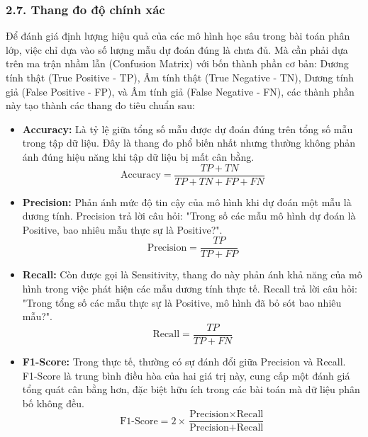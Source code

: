 \subsubsection{2.7. Thang đo độ chính xác}
\indent\indent Để đánh giá định lượng hiệu quả của các mô hình học sâu trong bài toán phân lớp, việc chỉ dựa vào số lượng mẫu dự đoán đúng là chưa đủ. Mà cần phải dựa trên ma trận nhầm lẫn (Confusion Matrix) với bốn thành phần cơ bản: Dương tính thật (True Positive - TP), Âm tính thật (True Negative - TN), Dương tính giả (False Positive - FP), và Âm tính giả (False Negative - FN), các thành phần này tạo thành các thang đo tiêu chuẩn sau:\vspace{-0.1cm}
\begin{itemize}[label={--}, itemsep=1pt]
    \item \textbf{Accuracy:} Là tỷ lệ giữa tổng số mẫu được dự đoán đúng trên tổng số mẫu trong tập dữ liệu. Đây là thang đo phổ biến nhất nhưng thường không phản ánh đúng hiệu năng khi tập dữ liệu bị mất cân bằng.
    \[
        \text{Accuracy} = \frac{TP + TN}{TP + TN + FP + FN}
    \]

    \item \textbf{Precision:} Phản ánh mức độ tin cậy của mô hình khi dự đoán một mẫu là dương tính. Precision trả lời câu hỏi: "Trong số các mẫu mô hình dự đoán là Positive, bao nhiêu mẫu thực sự là Positive?".
    \[
        \text{Precision} = \frac{TP}{TP + FP}
    \]

    \item \textbf{Recall:} Còn được gọi là Sensitivity, thang đo này phản ánh khả năng của mô hình trong việc phát hiện các mẫu dương tính thực tế. Recall trả lời câu hỏi: "Trong tổng số các mẫu thực sự là Positive, mô hình đã bỏ sót bao nhiêu mẫu?".
    \[
        \text{Recall} = \frac{TP}{TP + FN}
    \]

    \item \textbf{F1-Score:} Trong thực tế, thường có sự đánh đổi giữa Precision và Recall. F1-Score là trung bình điều hòa của hai giá trị này, cung cấp một đánh giá tổng quát cân bằng hơn, đặc biệt hữu ích trong các bài toán mà dữ liệu phân bố không đều.
    \[
        \text{F1-Score} = 2 \times \frac{\text{Precision} \times \text{Recall}}{\text{Precision} + \text{Recall}}
    \]
\end{itemize}